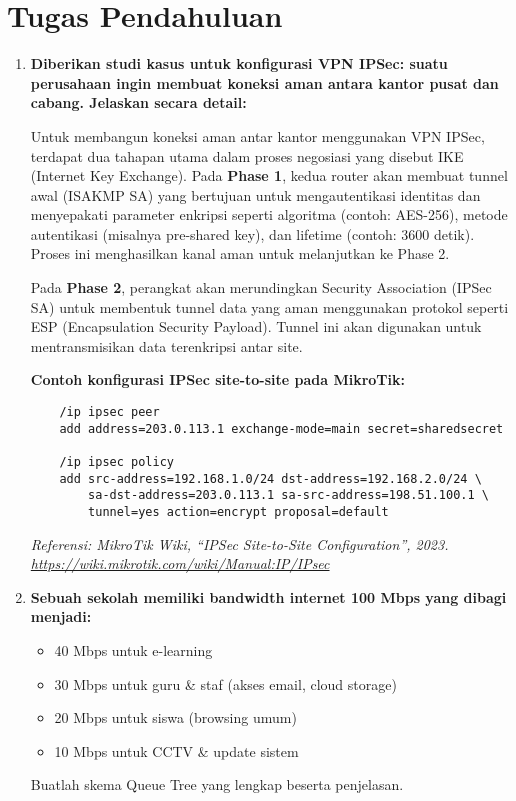 \section{Tugas Pendahuluan}
\begin{enumerate}
    \item \textbf{Diberikan studi kasus untuk konfigurasi VPN IPSec: suatu perusahaan ingin membuat koneksi aman antara kantor pusat dan cabang. Jelaskan secara detail:}
    
    Untuk membangun koneksi aman antar kantor menggunakan VPN IPSec, terdapat dua tahapan utama dalam proses negosiasi yang disebut IKE (Internet Key Exchange). Pada \textbf{Phase 1}, kedua router akan membuat tunnel awal (ISAKMP SA) yang bertujuan untuk mengautentikasi identitas dan menyepakati parameter enkripsi seperti algoritma (contoh: AES-256), metode autentikasi (misalnya pre-shared key), dan lifetime (contoh: 3600 detik). Proses ini menghasilkan kanal aman untuk melanjutkan ke Phase 2.

    Pada \textbf{Phase 2}, perangkat akan merundingkan Security Association (IPSec SA) untuk membentuk tunnel data yang aman menggunakan protokol seperti ESP (Encapsulation Security Payload). Tunnel ini akan digunakan untuk mentransmisikan data terenkripsi antar site.

    \textbf{Contoh konfigurasi IPSec site-to-site pada MikroTik:}
    \begin{verbatim}
    /ip ipsec peer
    add address=203.0.113.1 exchange-mode=main secret=sharedsecret

    /ip ipsec policy
    add src-address=192.168.1.0/24 dst-address=192.168.2.0/24 \
        sa-dst-address=203.0.113.1 sa-src-address=198.51.100.1 \
        tunnel=yes action=encrypt proposal=default
    \end{verbatim}

    \textit{Referensi: MikroTik Wiki, ``IPSec Site-to-Site Configuration'', 2023. \url{https://wiki.mikrotik.com/wiki/Manual:IP/IPsec}}

    \item \textbf{Sebuah sekolah memiliki bandwidth internet 100 Mbps yang dibagi menjadi:} 
    \begin{itemize}
        \item 40 Mbps untuk e-learning
        \item 30 Mbps untuk guru \& staf (akses email, cloud storage)
        \item 20 Mbps untuk siswa (browsing umum)
        \item 10 Mbps untuk CCTV \& update sistem
    \end{itemize}
    Buatlah skema Queue Tree yang lengkap beserta penjelasan.


\end{enumerate}
